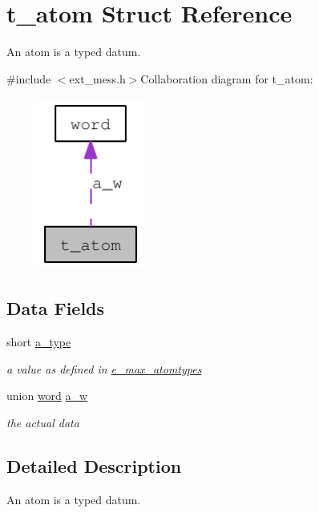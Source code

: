 \hypertarget{structt__atom}{
\section{t\_\-atom Struct Reference}
\label{structt__atom}
}


An atom is a typed datum.  


{\ttfamily \#include $<$ext\_\-mess.h$>$}Collaboration diagram for t\_\-atom:\nopagebreak
\begin{figure}[H]
\begin{center}
\leavevmode
\includegraphics[width=98pt]{structt__atom__coll__graph}
\end{center}
\end{figure}
\subsection*{Data Fields}
\begin{DoxyCompactItemize}
\item 
\hypertarget{structt__atom_a86aa4e605945738623b6f2b477c5a7d1}{
short \hyperlink{structt__atom_a86aa4e605945738623b6f2b477c5a7d1}{a\_\-type}}
\label{structt__atom_a86aa4e605945738623b6f2b477c5a7d1}

\begin{DoxyCompactList}\small\item\em a value as defined in \hyperlink{group__atom_ga8aa6700e9f00b132eb376db6e39ade47}{e\_\-max\_\-atomtypes} \item\end{DoxyCompactList}\item 
\hypertarget{structt__atom_a34dd9053b0a6585f90f4255da3f42d33}{
union \hyperlink{unionword}{word} \hyperlink{structt__atom_a34dd9053b0a6585f90f4255da3f42d33}{a\_\-w}}
\label{structt__atom_a34dd9053b0a6585f90f4255da3f42d33}

\begin{DoxyCompactList}\small\item\em the actual data \item\end{DoxyCompactList}\end{DoxyCompactItemize}


\subsection{Detailed Description}
An atom is a typed datum. 
